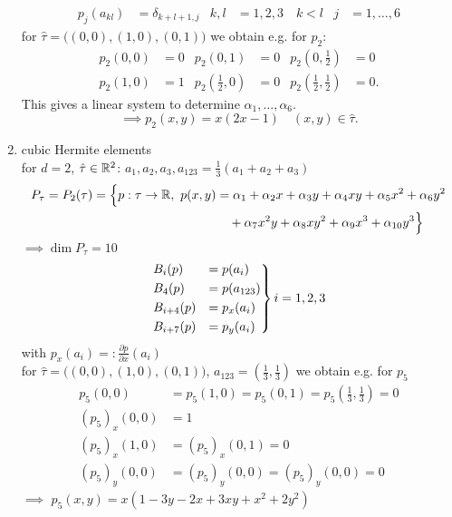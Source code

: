 \begin{example}
\begin{enumerate}[label=(\roman*)]
\begin{align*}
			p_j(a_{kl}) &= \delta_{k+l+1,j} &  k,l&=1,2,3\quad k<l &  j&=1,\dots,6 
		\end{align*}
		for $\hat{\tau} = \Big ( (0,0),(1,0),(0,1) \Big )$ we obtain e.g. for $p_2$:
		\begin{align*}
			p_2(0,0) &= 0 &  p_2(0,1) &= 0 &  p_2(0,\frac{1}{2})&= 0\\
			p_2(1,0) &= 1 &  p_2(\frac{1}{2},0) &= 0 &  p_2(\frac{1}{2},\frac{1}{2})&= 0.
		\end{align*}
		This gives a linear system to determine $\alpha_1,\dots,\alpha_6$.
		\begin{equation*}
			\implies p_2(x,y) = x(2x-1) \quad (x,y)\in \hat{\tau}.
		\end{equation*}
		\item cubic Hermite elements\\
		for \underline{$d=2$}, $\hat{\tau} \in \mathbb{R}^2$: $a_1,a_2,a_3, a_{123} = \frac{1}{3}(a_1+a_2+a_3)$
		\begin{align*}
		P_{\tau} = P_2(\tau) = \Big\{ p:\tau \to \mathbb{R},\ p(x,y) &= \alpha_1 + \alpha_2 x + \alpha_3 y + \alpha_4 xy + \alpha_5 x^2 + \alpha_6 y^2 
		\\&\quad + \alpha_7x^2y +\alpha_8xy^2 +\alpha_9x^3 + \alpha_{10}y^3\Big\}
		\end{align*}
		$\implies \dim P_{\tau}= 10$
		\begin{equation*}
			\begin{rcases}
			B_i(p) &= p(a_i)\\
			B_4(p) &= p(a_{123})\\
			B_{i+4}(p) &= p_x(a_i)\\
			B_{i+7}(p) &= p_y(a_i)
			\end{rcases}
			i = 1,2,3
		\end{equation*}
		with $ p_x(a_i) =: \frac{\partial p}{\partial x}(a_i) $\\
		for $\hat{\tau} = \Big ( (0,0),(1,0),(0,1) \Big )$, $a_{123} = (\frac{1}{3},\frac{1}{3})$ we obtain e.g. for $p_5$ 
		\begin{align*}
			p_5(0,0) &= p_5(1,0) = p_5(0,1) = p_5(\frac{1}{3},\frac{1}{3}) = 0\\
			(p_5)_x(0,0) &= 1\\
			(p_5)_x(1,0) &= (p_5)_x(0,1) = 0\\
			(p_5)_y(0,0) &= (p_5)_y(0,0) = (p_5)_y(0,0) = 0
		\end{align*}
		$\implies$ $p_5(x,y) = x \left( 1 -3y -2x +3xy +x^2+2y^2 \right)$
	\end{enumerate}
\end{example}

